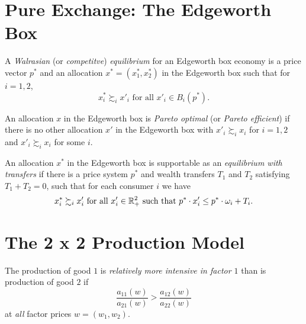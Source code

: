 \addtocounter{section}{1}

\section{Pure Exchange: The Edgeworth Box}

\begin{defn}
    A \emph{Walrasian} (or \emph{competitve}) \emph{equilibrium} for an Edgeworth box economy is a price vector $p^*$ and an allocation $x^* = (x^*_1, x^*_2)$ in the Edgeworth box such that for $i = 1, 2$,
    \begin{equation*}
        x^*_i \succsim_i x'_i \text{ for all } x'_i \in B_i(p^*).
    \end{equation*}
\end{defn}

\begin{defn}
    An allocation $x$ in the Edgeworth box is \emph{Pareto optimal} (or \emph{Pareto efficient}) if there is no other allocation $x'$ in the Edgeworth box with $x'_i \succsim_i x_i$ for $i = 1, 2$ and $x'_i \succsim_i x_i$ for some $i$.
\end{defn}

\begin{defn}
    An allocation $x^*$ in the Edgeworth box is supportable as an \emph{equilibrium with transfers} if there is a price system $p^*$ and wealth transfers $T_1$ and $T_2$ satisfying $T_1 + T_2 = 0$, such that for each consumer $i$ we have
    \begin{equation*}
        x^*_i \succsim_i x'_i \text{ for all } x'_i \in \mathbb{R}^2_+ \text{ such that } p^* \cdot x'_i \leq p^* \cdot \omega_i + T_i.
    \end{equation*}
\end{defn}


\addtocounter{section}{1}


\section{The 2 x 2 Production Model}

\begin{defn}
    The production of good $1$ is \emph{relatively more intensive in factor $1$} than is production of good $2$ if
    \begin{equation*}
        \frac{a_{11}(w)}{a_{21}(w)} > \frac{a_{12}(w)}{a_{22}(w)}
    \end{equation*}
    at \emph{all} factor prices $w = (w_1, w_2)$.
\end{defn}
